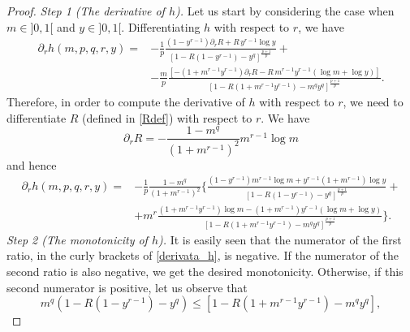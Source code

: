 \documentclass[10pt,a4paper]{amsart}
\newcommand{\de}{\partial}
\begin{document}
\begin{proof}
{\it Step 1 (The derivative of $h$).} Let us start by considering the case when $m\in]0,1[$ and $y\in]0,1[$.
Differentiating $h$ with respect to $r$, we have
\begin{equation*}
\begin{split}
\de_{r}h (m,p,q,r,y)= &- \frac 1 p \frac {(1-y^{r-1})\de_{r} R + R\, y^{r-1}\log y}{\left[1-R(1- y^{r-1}) - y^q\right]^\frac{p+1}p} +\\[.2cm]
&- \frac m p \frac{
[-(1+m^{r-1}y^{r-1})\de_{r}R- R\,m^{r-1}y^{r-1}(\log m +\log y)]}{ \left[1-R(1+m^{r-1}y^{r-1})-m^{q}y^{q}\right]^\frac {p+1} p}.
\end{split}
\end{equation*}
Therefore, in order to compute the derivative of $h$ with respect to $r$, we need to differentiate $R$ (defined in \eqref{Rdef}) with respect to $r$. We have
\[
\de_{r}R= -\frac{1-m^{q}}{(1+m^{r-1})^{2}}m^{r-1}\log m
\]
and hence
\begin{equation}
\begin{split}
\label{derivata_h}
\de_{r}h (m,p,q,r,y)= &-\frac1p\frac{1-m^{q}}{(1+m^{r-1})^{2}}\bigg\{\frac{ (1-y^{r-1})m^{r-1}\log m +y^{r-1}(1+m^{r-1})\log y}{\left[1-R(1- y^{r-1}) - y^q\right]^\frac{p+1}p}+ \\[.3cm]
& +m^r \frac{(1+m^{r-1}y^{r-1})\log m-(1+m^{r-1})y^{r-1}(\log m +\log y)}{ \left[1-R(1+m^{r-1}y^{r-1})-m^{q}y^{q}\right]^\frac {p+1} p}\bigg\}.
\end{split}
\end{equation}
{\it Step 2 (The monotonicity of $h$).}
It is easily seen that the numerator of the first ratio, in the curly brackets of \eqref{derivata_h}, is negative. If the numerator of the second ratio is also negative, we get the desired monotonicity. %
Otherwise, if this second numerator is positive, let us observe that
\begin{equation*}
m^q(1-R(1- y^{r-1}) - y^q)\leq [1-R(1+m^{r-1}y^{r-1})-m^{q}y^{q}],

\end{equation*}
\end{proof}
\end{document}
